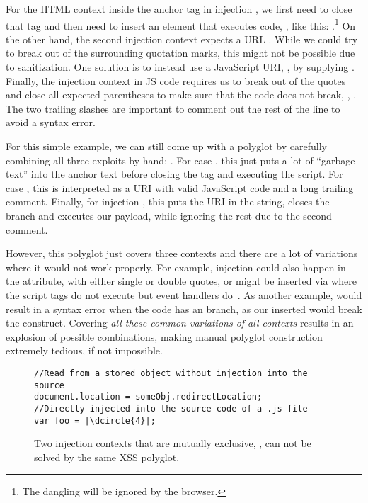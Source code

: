 For the HTML context inside the anchor tag in injection , we first need to close that tag and then need to insert an element that executes code, \eg, like this: .\footnote{The dangling  will be ignored by the browser.}
On the other hand, the second injection context expects a URL .
While we could try to break out of the surrounding quotation marks, this might not be possible due to sanitization.
One solution is to instead use a JavaScript URI, \eg, by supplying .
Finally, the injection context in JS code  requires us to break out of the quotes and close all expected parentheses to make sure that the code does not break, \eg, .
The two trailing slashes are important to comment out the rest of the line to avoid a syntax error.

For this simple example, we can still come up with a polyglot by carefully combining all three exploits by hand: . %
For case , this just puts a lot of ``garbage text'' into the anchor text before closing the tag and executing the script.
For case , this is interpreted as a URI with valid JavaScript code and a long trailing comment.
Finally, for injection , this puts the URI in the string, closes the -branch and executes our payload, while ignoring the rest due to the second \code{//} comment.

However, this polyglot just covers three contexts and there are a lot of variations where it would not work properly.
For example, injection  could also happen in the  attribute, with either single or double quotes, or might be inserted via  where the script tags do not execute but event handlers do~\cite{whatwg-html-parsing-flags}.
As another example,  would result in a syntax error when the code has an  branch, as our inserted  would break the  construct.
Covering \emph{all these common variations of all contexts} results in an explosion of possible combinations, making manual polyglot construction extremely tedious, if not impossible.

\begin{figure}[htb]
\begin{verbatim}
//Read from a stored object without injection into the source
document.location = someObj.redirectLocation;
//Directly injected into the source code of a .js file
var foo = |\dcircle{4}|;
\end{verbatim}

\caption{Two injection contexts that are mutually exclusive, \ie, can not be solved by the same XSS polyglot.}\label{fig:mutually-exclusive}
\end{figure}

